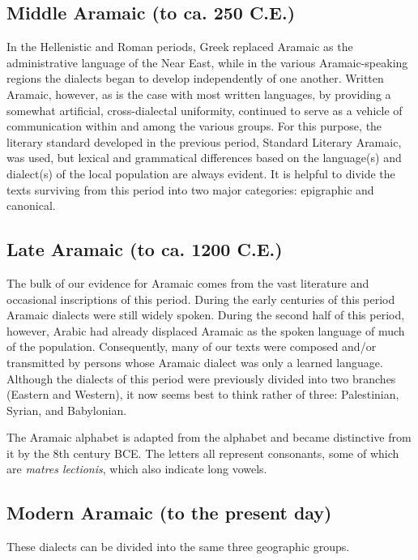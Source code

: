 \subsection{Middle Aramaic (to ca. 250 C.E.)}
In the Hellenistic and Roman periods, Greek replaced
Aramaic as the administrative language of the Near
East, while in the various Aramaic-speaking regions
the dialects began to develop independently of one
another. Written Aramaic, however, as is the case
with most written languages, by providing a
somewhat artificial, cross-dialectal uniformity,
continued to serve as a vehicle of communication
within and among the various groups. For this
purpose, the literary standard developed in the
previous period, Standard Literary Aramaic, was
used, but lexical and grammatical differences based
on the language(s) and dialect(s) of the local
population are always evident. It is helpful to divide
the texts surviving from this period into two major
categories: epigraphic and canonical.

\subsection{Late Aramaic (to ca. 1200 C.E.)}
The bulk of
our evidence for Aramaic comes from the vast
literature and occasional inscriptions of this period.
During the early centuries of this period Aramaic
dialects were still widely spoken. During the second
half of this period, however, Arabic had already
displaced Aramaic as the spoken language of much
of the population. Consequently, many of our texts
were composed and/or transmitted by persons whose
Aramaic dialect was only a learned language.
Although the dialects of this period were previously
divided into two branches (Eastern and Western), it
now seems best to think rather of three: Palestinian,
Syrian, and Babylonian.

The Aramaic alphabet is adapted from the  alphabet and became distinctive from it by the 8th century BCE.  The letters all represent consonants, some of which are \emph{matres lectionis}, which also indicate long vowels.

\subsection{Modern Aramaic (to the present day)}

These dialects can be divided into the same three
geographic groups.

